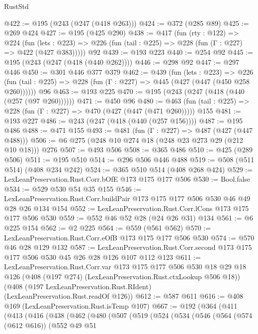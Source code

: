\begin{lexlean}{RustStd}
\begin{coremodule}
{\begin{coremodule}
{{{{{@422 := @195 (@243 (@247 (@418 @263)))
@424 := @372 (@285 @89)
@425 := @269 @424
@427 := @195 (@425 @290)
@438 := @417
    (fun (rty : @122) =>
    @224
      (fun (lets : @223) => @226 (fun (tail : @225) => @228 (fun (Γ : @227) => @422 (@427 @383)))))
    @92
@439 := @193 @223
@440 := @254 @92
@445 := @195 (@243 (@247 (@418 (@440 @262))))
@446 := @298 @92
@447 := @297 @446
@450 := @301 @446 @377 @379
@462 := @439
    (fun (lets : @223) =>
    @226 (fun (tail : @225) => @228 (fun (Γ : @227) => @445 (@427 (@447 (@450 @258 @260))))))
    @96
@463 := @193 @225
@470 := @195 (@243 (@247 (@418 (@440 (@257 (@97 @260))))))
@471 := @450 @96
@480 := @463 (fun (tail : @225) => @228 (fun (Γ : @227) => @470 (@427 (@447 (@471 @260))))) @155
@481 := @193 @227
@486 := @243 (@247 (@418 (@440 (@257 @156))))
@487 := @195 @486
@488 := @471 @155
@493 := @481 (fun (Γ : @227) => @487 (@427 (@447 @488)))
@506 := @6 @275 (@248 @10 @274 @18 (@248 @23 @273 @29 (@212 @10 @18))) @276
@507 := @493 @506
@508 := @365 @486
@510 := @425 (@289 @506)
@511 := @195 @510
@514 := @296 @506 @446 @488
@519 := @508 (@511 @514) (@408 @234 @242)
@524 := @365 @510 @514 (@408 @268 @424)
@529 := LexLeanPreservation.Rust.Corr.bOfE @173 @175 @177 @506
@530 := Bool.false
@534 := @529 @530 @54 @35 @155
@546 := LexLeanPreservation.Rust.Corr.buildPair @173 @175 @177 @506 @530 @46 @49 @28 @26 @134 @154
@552 := LexLeanPreservation.Rust.Corr.lCons @173 @175 @177 @506 @530
@559 := @552 @46 @52 @28 (@24 @26 @31) @134
@561 := @6 @225 @154
@562 := @2 @225
@564 := @559 (@561 @562)
@570 := LexLeanPreservation.Rust.Corr.eOfB @173 @175 @177 @506 @530
@574 := @570 @46 @28 @129 @132
@587 := LexLeanPreservation.Rust.Corr.second
    @173
    @175
    @177
    @506
    @530
    @45
    @26
    @28
    @126
    @107
    @112
    @123
@611 := LexLeanPreservation.Rust.Corr.var
    @173
    @175
    @177
    @506
    @530
    @18
    @29
    @18
    @126
    (@408 (@197 @274) (LexLeanPreservation.Rust.ctxLookup @506 @18))
    (@408 (@197 LexLeanPreservation.Rust.RIdent) (LexLeanPreservation.Rust.readOf @126))
@612 := @587 @611
@616 := @408 @169 (LexLeanPreservation.Rust.isTemp @107)
@667 := @192
    (@364
      (@411
        (@413
          (@416
            (@438
              (@462
                (@480
                  (@507
                    (@519
                      (@524
                        (@534
                          (@546
                            (@564
                              (@574 (@612 @616))
                              (@552
                                @49
                                @51
}}}}}
\end{coremodule}}
\end{coremodule}
\end{lexlean}
